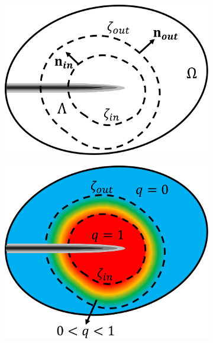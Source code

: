 
\begin{figure}[ht]
\begin{subfigure}{.49\textwidth}
  \centering
  \includegraphics[width=0.8\linewidth]{images/theory_part/j_integral_bw.pdf}
  \bigskip
  \bigskip
  \caption{}
  \label{fig:j_integral}
\end{subfigure}%
\begin{subfigure}{.49\textwidth}
  \centering
  \includegraphics[width=0.8\linewidth]{images/theory_part/j_integral_bw_q.pdf}

\end{subfigure}
\end{figure}
